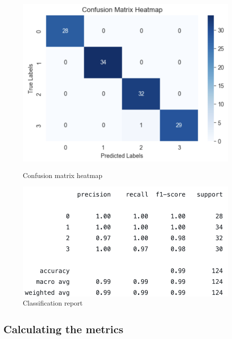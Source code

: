 \begin{figure}[H]
    \centering
    \begin{minipage}{0.48\textwidth}
        \centering
        \includegraphics[scale=0.25]{src/images/heatmap_metric.png}
        \vspace{-0.3cm}
        \caption{Confusion matrix heatmap}
        \label{fig:heatmap}
    \end{minipage}
    \hfill
    \begin{minipage}{0.48\textwidth}
        \centering
        \vspace{0.4cm}
        \includegraphics[scale=0.33]{src/images/cnn_report.png}
        \vspace{0.15cm}
        \caption{Classification report}
        \label{fig:report}
    \end{minipage}
\end{figure}


\subsection{Calculating the metrics}


